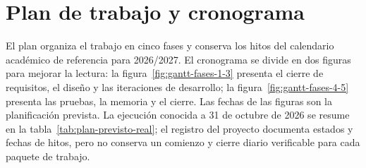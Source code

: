 \chapter{Plan de trabajo y cronograma}
\label{cap:plan-gantt}

El plan organiza el trabajo en cinco fases y conserva los hitos del calendario
académico de referencia para 2026/2027. El cronograma se divide en dos figuras
para mejorar la lectura: la figura~\ref{fig:gantt-fases-1-3} presenta el
cierre de requisitos, el diseño y las iteraciones de desarrollo; la
figura~\ref{fig:gantt-fases-4-5} presenta las pruebas, la memoria y el cierre.
Las fechas de las figuras son la planificación prevista. La ejecución conocida
a 31 de octubre de 2026 se resume en la tabla~\ref{tab:plan-previsto-real};
el registro del proyecto documenta estados y fechas de hitos, pero no conserva
un comienzo y cierre diario verificable para cada paquete de trabajo.

